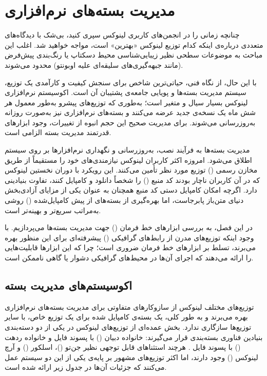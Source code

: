 \chapter{مدیریت بسته‌های نرم‌افزاری}

چنانچه زمانی را در انجمن‌های کاربری لینوکس سپری کنید، بی‌شک با دیدگاه‌های متعددی درباره‌ی اینکه کدام توزیع لینوکس «بهترین» است، مواجه خواهید شد. اغلب این مباحث به موضوعات سطحی نظیر زیبایی‌شناسی محیط دسکتاپ یا رنگ‌بندی پیش‌فرض (مانند جبهه‌گیری‌های سلیقه‌ای علیه اوبونتو) محدود می‌شوند.

با این حال، از نگاه فنی، حیاتی‌ترین شاخص برای سنجش کیفیت و کارآمدی یک توزیع، سیستم مدیریت بسته‌ها و پویایی جامعه‌ی پشتیبان آن است. اکوسیستم نرم‌افزاری لینوکس بسیار سیال و متغیر است؛ به‌طوری که توزیع‌های پیشرو به‌طور معمول هر شش ماه یک نسخه‌ی جدید عرضه می‌کنند و بسته‌های نرم‌افزاری نیز به‌صورت روزانه به‌روزرسانی می‌شوند. برای مدیریت صحیح این حجم انبوه از تغییرات، وجود ابزارهای قدرتمند مدیریت بسته الزامی است.

مدیریت بسته‌ها به فرآیند نصب، به‌روزرسانی و نگهداری نرم‌افزارها بر روی سیستم اطلاق می‌شود. امروزه اکثر کاربران لینوکس نیازمندی‌های خود را مستقیماً از طریق مخازن رسمی () توزیع مورد نظر تأمین می‌کنند. این رویکرد با دوران نخستین لینوکس که در آن کاربران ناچار بودند کد منبع () را شخصاً دانلود و کامپایل کنند، تفاوت بنیادینی دارد. اگرچه امکان کامپایل دستی کد منبع همچنان به عنوان یکی از مزایای آزادی‌بخش دنیای متن‌باز پابرجاست، اما بهره‌گیری از بسته‌های از پیش کامپایل‌شده () روشی به‌مراتب سریع‌تر و بهینه‌تر است.

در این فصل، به بررسی ابزارهای خط فرمان () جهت مدیریت بسته‌ها می‌پردازیم. با وجود اینکه توزیع‌های مدرن از رابط‌های گرافیکی () پیشرفته‌ای برای این منظور بهره می‌برند، تسلط بر ابزارهای خط فرمان ضروری است؛ چرا که این ابزارها قابلیت‌هایی را ارائه می‌دهند که اجرای آن‌ها در محیط‌های گرافیکی دشوار یا گاهی ناممکن است.

\section{اکوسیستم‌های مدیریت بسته}

توزیع‌های مختلف لینوکس از سازوکارهای متفاوتی برای مدیریت بسته‌های نرم‌افزاری بهره می‌برند و به طور کلی، یک بسته‌ی کامپایل شده برای یک توزیع خاص، با سایر توزیع‌ها سازگاری ندارد. بخش عمده‌ای از توزیع‌های لینوکس در یکی از دو دسته‌بندی بنیادین فناوری بسته‌بندی قرار می‌گیرند: خانواده دبیان () با پسوند فایل  و خانواده ردهت () با پسوند فایل . هرچند استثناهای قابل توجهی نظیر جن‌تو ()، اسلکور () و آرچ لینوکس () وجود دارند، اما اکثر توزیع‌های مشهور بر پایه‌ی یکی از این دو سیستم عمل می‌کنند که جزئیات آن‌ها در جدول زیر ارائه شده است.

